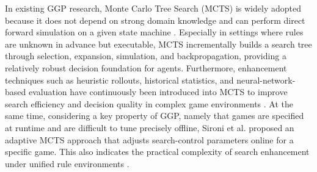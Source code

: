 In existing GGP research, Monte Carlo Tree Search (MCTS) is widely adopted because it does not depend on strong domain knowledge and can perform direct forward simulation on a given state machine \cite{browne2012survey}. Especially in settings where rules are unknown in advance but executable, MCTS incrementally builds a search tree through selection, expansion, simulation, and backpropagation, providing a relatively robust decision foundation for agents. Furthermore, enhancement techniques such as heuristic rollouts, historical statistics, and neural-network-based evaluation have continuously been introduced into MCTS to improve search efficiency and decision quality in complex game environments \cite{finnsson2008simulation,anthony2017thinking,silver2018general}. At the same time, considering a key property of GGP, namely that games are specified at runtime and are difficult to tune precisely offline, Sironi et al. proposed an adaptive MCTS approach that adjusts search-control parameters online for a specific game. This also indicates the practical complexity of search enhancement under unified rule environments \cite{sironi2020selfadaptive}.


